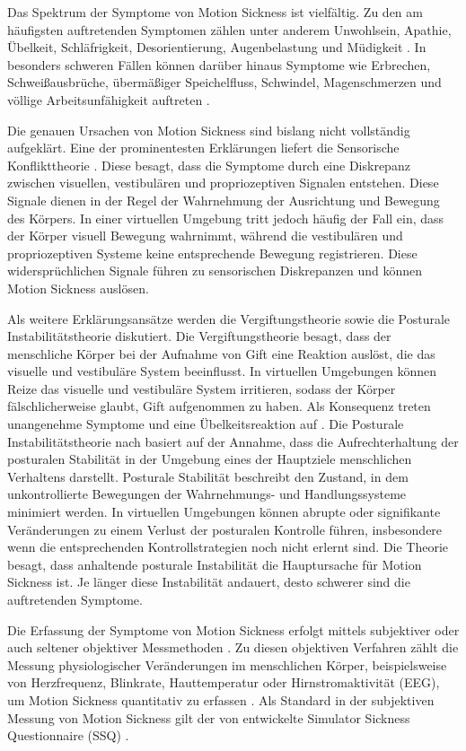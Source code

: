 Das Spektrum der Symptome von Motion Sickness ist vielfältig. Zu den am häufigsten auftretenden Symptomen zählen unter anderem Unwohlsein, Apathie, Übelkeit, Schläfrigkeit, Desorientierung, Augenbelastung und Müdigkeit \citep{somrak_estimating_2019}. In besonders schweren Fällen können darüber hinaus Symptome wie Erbrechen, Schweißausbrüche, übermäßiger Speichelfluss, Schwindel, Magenschmerzen und völlige Arbeitsunfähigkeit auftreten \citep{kennedy_research_2010}. 

Die genauen Ursachen von Motion Sickness sind bislang nicht vollständig aufgeklärt. Eine der prominentesten Erklärungen liefert die Sensorische Konflikttheorie \citep{oman_motion_1990}. Diese besagt, dass die Symptome durch eine Diskrepanz zwischen visuellen, vestibulären und propriozeptiven Signalen entstehen. Diese Signale dienen in der Regel der Wahrnehmung der Ausrichtung und Bewegung des Körpers. In einer virtuellen Umgebung tritt jedoch häufig der Fall ein, dass der Körper visuell Bewegung wahrnimmt, während die vestibulären und propriozeptiven Systeme keine entsprechende Bewegung registrieren. Diese widersprüchlichen Signale führen zu sensorischen Diskrepanzen und können Motion Sickness auslösen. 

Als weitere Erklärungsansätze werden die Vergiftungstheorie sowie die Posturale Instabilitätstheorie diskutiert. Die Vergiftungstheorie besagt, dass der menschliche Körper bei der Aufnahme von Gift eine Reaktion auslöst, die das visuelle und vestibuläre System beeinflusst. In virtuellen Umgebungen können Reize das visuelle und vestibuläre System irritieren, sodass der Körper fälschlicherweise glaubt, Gift aufgenommen zu haben. Als Konsequenz treten unangenehme Symptome und eine Übelkeitsreaktion auf \citep{laviola_discussion_2000}. Die Posturale Instabilitätstheorie nach \citet{riccio_ecological_1991} basiert auf der Annahme, dass die Aufrechterhaltung der posturalen Stabilität in der Umgebung eines der Hauptziele menschlichen Verhaltens darstellt. Posturale Stabilität beschreibt den Zustand, in dem unkontrollierte Bewegungen der Wahrnehmungs- und Handlungssysteme minimiert werden. In virtuellen Umgebungen können abrupte oder signifikante Veränderungen zu einem Verlust der posturalen Kontrolle führen, insbesondere wenn die entsprechenden Kontrollstrategien noch nicht erlernt sind. Die Theorie besagt, dass anhaltende posturale Instabilität die Hauptursache für Motion Sickness ist. Je länger diese Instabilität andauert, desto schwerer sind die auftretenden Symptome.

Die Erfassung der Symptome von Motion Sickness erfolgt mittels subjektiver oder auch seltener objektiver Messmethoden \citep{somrak_estimating_2019}. Zu diesen objektiven Verfahren zählt die Messung physiologischer Veränderungen im menschlichen Körper, beispielsweise von Herzfrequenz, Blinkrate, Hauttemperatur oder Hirnstromaktivität (EEG), um Motion Sickness quantitativ zu erfassen \citep{somrak_estimating_2019}. Als Standard in der subjektiven Messung von Motion Sickness gilt der von \citet{kennedy_simulator_1993} entwickelte Simulator Sickness Questionnaire (SSQ) \citep{jerald_vr_2016}.

